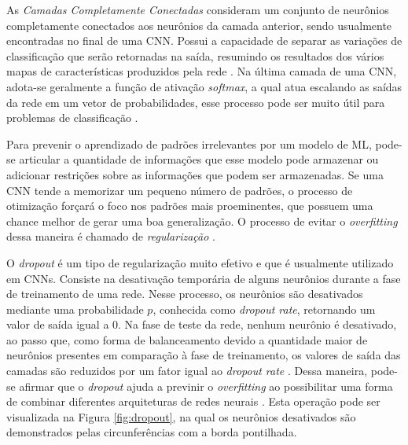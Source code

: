 
As \emph{Camadas Completamente Conectadas} consideram um conjunto de neurônios completamente conectados aos neurônios da camada anterior, sendo usualmente encontradas no final de uma CNN. Possui a capacidade de separar as variações de classificação que serão retornadas na saída, resumindo os resultados dos vários mapas de características produzidos pela rede \cite{khan}. Na última camada de uma CNN, adota-se geralmente a função de ativação \emph{softmax}, a qual atua escalando as saídas da rede em um vetor de probabilidades, esse processo pode ser muito útil para problemas de classificação \cite{gulli}.

Para prevenir o aprendizado de padrões irrelevantes por um modelo de ML, pode-se articular a quantidade de informações que esse modelo pode armazenar ou adicionar restrições sobre as informações que podem ser armazenadas. Se uma CNN tende a memorizar um pequeno número de padrões, o processo de otimização forçará o foco nos padrões mais proeminentes, que possuem uma chance melhor de gerar uma boa generalização. O processo de evitar o \emph{overfitting} dessa maneira é chamado de \emph{regularização} \cite{chollet}.

O \emph{dropout} é um tipo de regularização muito efetivo e que é usualmente utilizado em CNNs. Consiste na desativação temporária de alguns neurônios durante a fase de treinamento de uma rede. Nesse processo, os neurônios são desativados mediante uma probabilidade $p$, conhecida como \emph{dropout rate}, retornando um valor de saída igual a $0$. Na fase de teste da rede, nenhum neurônio é desativado, ao passo que, como forma de balanceamento devido a quantidade maior de neurônios presentes em comparação à fase de treinamento, os valores de saída das camadas são reduzidos por um fator igual ao \emph{dropout rate} \cite{chollet}. Dessa maneira, pode-se afirmar que o \emph{dropout} ajuda a previnir o \emph{overfitting} ao possibilitar uma forma de combinar diferentes arquiteturas de redes neurais \cite{buduma}. Esta operação pode ser visualizada na Figura \ref{fig:dropout}, na qual os neurônios desativados são demonstrados pelas circunferências com a borda pontilhada.

